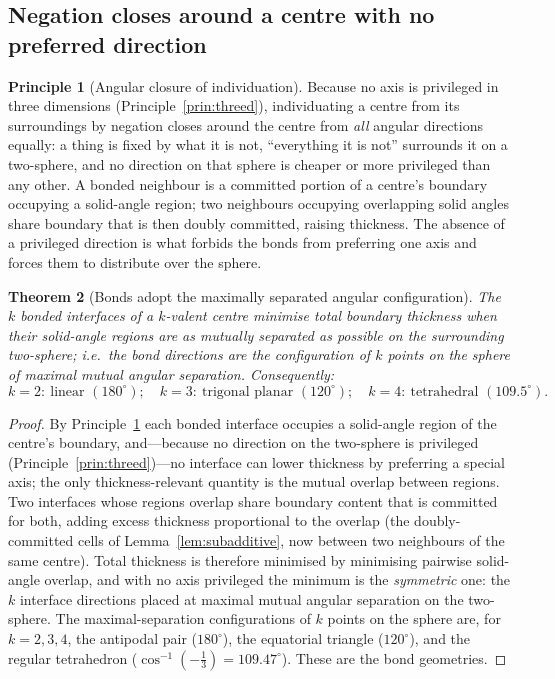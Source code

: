\documentclass[11pt,a4paper]{article}
\theoremstyle{thmstyle}
\newtheorem{theorem}{Theorem}[section]
\theoremstyle{definition}
\newtheorem{principle}[theorem]{Principle}
\theoremstyle{remark}
\begin{document}
\subsection{Negation closes around a centre with no preferred direction}

\begin{principle}[Angular closure of individuation]
\label{prin:closure}
Because no axis is privileged in three dimensions
(Principle~\ref{prin:threed}), individuating a centre from its
surroundings by negation closes around the centre from \emph{all} angular
directions equally: a thing is fixed by what it is not, ``everything it is
not'' surrounds it on a two-sphere, and no direction on that sphere is
cheaper or more privileged than any other. A bonded neighbour is a
committed portion of a centre's boundary occupying a solid-angle region;
two neighbours occupying overlapping solid angles share boundary that is
then doubly committed, raising thickness. The absence of a privileged
direction is what forbids the bonds from preferring one axis and forces
them to distribute over the sphere.
\end{principle}

\begin{theorem}[Bonds adopt the maximally separated angular configuration]
\label{thm:geometry}
The $k$ bonded interfaces of a $k$-valent centre minimise total boundary
thickness when their solid-angle regions are as mutually separated as
possible on the surrounding two-sphere; i.e.\ the bond directions are the
configuration of $k$ points on the sphere of maximal mutual angular
separation. Consequently:
\[
k=2:\ \text{linear }(180^\circ);\quad
k=3:\ \text{trigonal planar }(120^\circ);\quad
k=4:\ \text{tetrahedral }(109.5^\circ).
\]
\end{theorem}

\begin{proof}
By Principle~\ref{prin:closure} each bonded interface occupies a
solid-angle region of the centre's boundary, and---because no direction
on the two-sphere is privileged (Principle~\ref{prin:threed})---no
interface can lower thickness by preferring a special axis; the only
thickness-relevant quantity is the mutual overlap between regions. Two
interfaces whose regions
overlap share boundary content that is committed for both, adding excess
thickness proportional to the overlap (the doubly-committed cells of
Lemma~\ref{lem:subadditive}, now between two neighbours of the same
centre). Total thickness is therefore minimised by minimising pairwise
solid-angle overlap, and with no axis privileged the minimum is the
\emph{symmetric} one: the $k$ interface directions placed at
maximal mutual angular separation on the two-sphere. The maximal-separation
configurations of $k$ points on the sphere are, for $k=2,3,4$, the
antipodal pair ($180^\circ$), the equatorial triangle ($120^\circ$), and
the regular tetrahedron ($\cos^{-1}(-\tfrac13)=109.47^\circ$). These are
the bond geometries.
\end{proof}
\end{document}
